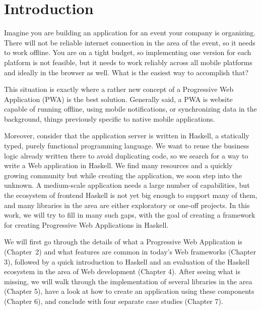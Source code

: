 \documentclass[english,zadani,odsaz]{fitthesis}
\date{\today}
\title{}
\begin{document}
\maketitle
\setlength{\parskip}{0pt}
{\hypersetup{hidelinks}\tableofcontents}
\iftotalfigures\listoffigures\fi
\iftotaltables\listoftables\fi
\iftotallistings\listoflistings\fi
\iftwoside\cleardoublepage\fi
\setlength{\parskip}{0.5\bigskipamount}

\chapter{Introduction}
\label{sec:org2128abd}
Imagine you are building an application for an event your company is
organizing. There will not be reliable internet connection in the area of the
event, so it needs to work offline. You are on a tight budget, so implementing
one version for each platform is not feasible, but it needs to work reliably
across all mobile platforms and ideally in the browser as well. What is the
easiest way to accomplish that?

This situation is exactly where a rather new concept of a Progressive Web
Application (PWA) is the best solution. Generally said, a PWA is website
capable of running offline, using mobile notifications, or synchronizing data in
the background, things previously specific to native mobile applications.

Moreover, consider that the application server is written in Haskell, a
statically typed, purely functional programming language. We want to reuse the
business logic already written there to avoid duplicating code, so we search for
a way to write a Web application in Haskell. We find many resources and a
quickly growing community but while creating the application, we soon step into
the unknown. A medium-scale application needs a large number of capabilities,
but the ecosystem of frontend Haskell is not yet big enough to support many of
them, and many libraries in the area are either exploratory or one-off projects.
In this work, we will try to fill in many such gaps, with the goal of creating a
framework for creating Progressive Web Applications in Haskell.

We will first go through the details of what a Progressive Web Application is
(Chapter~2) and what features are common in today's Web frameworks (Chapter 3),
followed by a quick introduction to Haskell and an evaluation of the Haskell
ecosystem in the area of Web development (Chapter 4). After seeing what is
missing, we will walk through the implementation of several libraries in the
area (Chapter 5), have a look at how to create an application using these
components (Chapter 6), and conclude with four separate case studies (Chapter
7).
\end{document}
